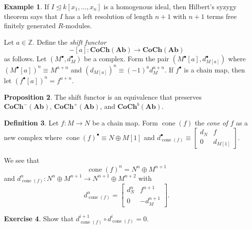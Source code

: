 \documentclass[10pt,letterpaper,cm]{nupset}
\theoremstyle{definition}
\newtheorem{definition}{Definition}[subsection]
\newtheorem{exmp}[definition]{Example}
\theoremstyle{theorem}
\newtheorem{prop}[definition]{Proposition}
\newtheorem{exercise}[definition]{Exercise}
\theoremstyle{remark}
\newcommand{\Z}{\mathbb Z}
\newcommand{\1}{\mathbf{1}}
\newcommand{\0}{\vec 0}
\DeclareMathOperator{\cone}{cone}
\begin{document}
\begin{exmp}
If $I \unlhd k[x_1, \ldots, x_n]$ is a homogenous ideal, then Hilbert's syzygy theorem says that $I$ has a left resolution of length $n+1$ with $n+1$ terms free finitely generated $R$-modules.
\end{exmp}

\smallskip

Let $a\in \Z$. Define the \textit{shift functor} $${-}[a] : \mathbf{CoCh}(\mathbf{Ab}) \to \mathbf{CoCh}(\mathbf{Ab})$$ as follows. Let $\left(M^{\bullet}, d^{\bullet}_{M}\right)$ be a complex.  Form the pair $\left(M^{\bullet}[a], d^{\bullet}_{M[a]}\right)$ where $\left(M^{\bullet}[a]\right)^n \equiv M^{a+n}$ and $\left(d_{M[a]}\right)^n \equiv ({-1})^a d^{a+n}_M$. If $f^{\bullet}$ is a chain map, then let $\left(f^{\bullet}[a]\right)^n = f^{a+n}$.


\begin{prop}
The shift functor  is an equivalence that preserves $\mathbf{CoCh}^{{-}}(\mathbf{Ab})$, $\mathbf{CoCh}^{+}(\mathbf{Ab})$, and $\mathbf{CoCh}^{b}(\mathbf{Ab})$.
\end{prop}

\begin{definition}
Let $f: M \to N$ be a chain map. Form  $\cone(f)$ the \textit{cone of $f$} as a new complex where $\cone(f)^{\bullet} \equiv N \oplus M[1]$ and $d_{\cone(f)}^{\bullet} \equiv \begin{bmatrix}  d_N & f \\ 0 & d_{M[1]}    \end{bmatrix}.$
\end{definition}


We see that $$\cone(f)^n = N^n \oplus M^{n+1}$$ and $d^n_{\cone(f)} : N^n \oplus M^{n+1} \to N^{n+1} \oplus M^{n+2}$ with $$d^n_{\cone(f)}  = \begin{bmatrix}  d_N^n & f^{n+1} \\ 0 & {-d_M^{n+1}}  \end{bmatrix}.$$


\begin{exercise}
Show that $d^{i+1}_{\cone(f)} \circ d^i_{\cone(f)} =0$.
\end{exercise}
\end{document}
